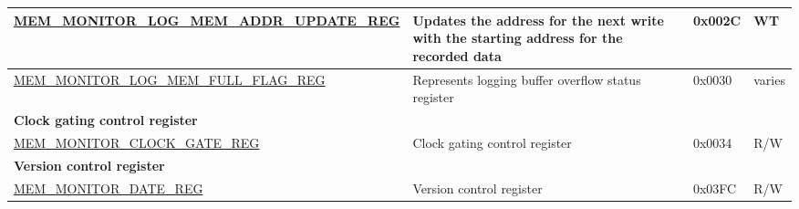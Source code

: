 \begin{longtable}{ | l | m{13cm} | l | l | }
\hyperref[regdesc:MEMMONITORLOGMEMADDRUPDATEREG]{MEM\_MONITOR\_LOG\_MEM\_ADDR\_UPDATE\_REG} & Updates the address for the next write with the starting address for the recorded data & 0x002C & WT \\ \hline
\hyperref[regdesc:MEMMONITORLOGMEMFULLFLAGREG]{MEM\_MONITOR\_LOG\_MEM\_FULL\_FLAG\_REG} & Represents logging buffer overflow status register & 0x0030 & varies \\ \hline
\multicolumn{4}{|l|}{\textbf{Clock gating control register}} \\ \hline
\hyperref[regdesc:MEMMONITORCLOCKGATEREG]{MEM\_MONITOR\_CLOCK\_GATE\_REG} & Clock gating control register & 0x0034 & R/W \\ \hline
\multicolumn{4}{|l|}{\textbf{Version control register}} \\ \hline
\hyperref[regdesc:MEMMONITORDATEREG]{MEM\_MONITOR\_DATE\_REG} & Version control register & 0x03FC & R/W \\ \hline
\end{longtable}
